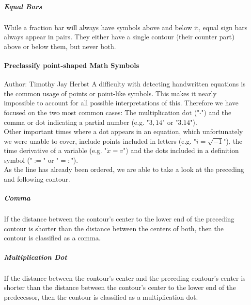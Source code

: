 \documentclass[12pt]{article}
\begin{document}
	\subparagraph{Equal Bars}\label{equalbars}
	While a fraction bar will always have symbols above and below it, equal sign bars always appear in pairs. They either have a single contour (their counter part) above or below them, but never both.
	
	\paragraph{Preclassify point-shaped Math Symbols}
	\small{Author: Timothy Jay Herbst} \newline \newline
	A difficulty with detecting handwritten equations is the common usage of points or point-like symbols.
	This makes it nearly impossible to account for all possible interpretations of this.
	Therefore we have focused on the two most common cases:
	The multiplication dot ("$\cdot$") and the comma or dot indicating a partial number (e.g. "$3,14$" or "$3.14$").\\
	Other important times where a dot appears in an equation, which unfortunately we were unable to cover, include points included in letters (e.g. "$i=\sqrt{-1}$"), the time derivative of a variable (e.g. "$\dot{x}=v$") and the dots included in a definition symbol ("$:=$" or "$=:$").\\  %
	As the line has already been ordered, we are able to take a look at the preceding and following contour.
	
	\subparagraph{Comma}
	If the distance between the contour's center to the lower end of the preceding contour is shorter than the distance between the centers of both, then the contour is classified as a comma.\\
	
	\subparagraph{Multiplication Dot}
	If the distance between the contour's center and the preceding contour's center is shorter than the distance between the contour's center to the lower end of the predecessor, then the contour is classified as a multiplication dot.\\
\end{document}
